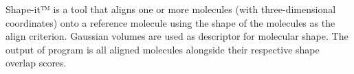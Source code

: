 Shape-it™ is a tool that aligns one or more molecules (with three-dimensional coordinates) onto a reference molecule using the shape of the molecules as the align criterion. Gaussian volumes are used as descriptor for molecular shape. The output of program is all aligned molecules alongside their respective shape overlap scores.